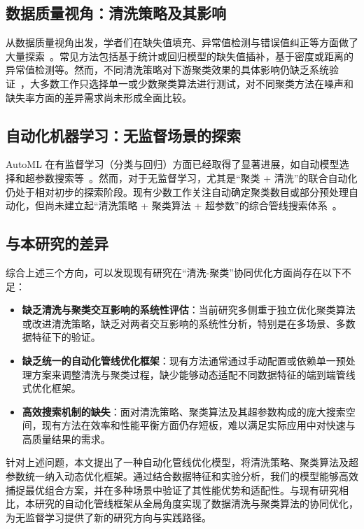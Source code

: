 \documentclass[10pt]{article} %
\numberwithin{equation}{section}
\begin{document}
\subsection{数据质量视角：清洗策略及其影响}
从数据质量视角出发，学者们在缺失值填充、异常值检测与错误值纠正等方面做了大量探索~\cite{ref5, ref6, ref7}。常见方法包括基于统计或回归模型的缺失值插补，基于密度或距离的异常值检测等。然而，不同清洗策略对下游聚类效果的具体影响仍缺乏系统验证~\cite{ref11, ref12}，大多数工作只选择单一或少数聚类算法进行测试，对不同聚类方法在噪声和缺失率方面的差异需求尚未形成全面比较。

\subsection{自动化机器学习：无监督场景的探索}
AutoML 在有监督学习（分类与回归）方面已经取得了显著进展，如自动模型选择和超参数搜索等~\cite{ref13, ref14}。然而，对于无监督学习，尤其是“聚类 + 清洗”的联合自动化仍处于相对初步的探索阶段。现有少数工作关注自动确定聚类数目或部分预处理自动化，但尚未建立起“清洗策略 + 聚类算法 + 超参数”的综合管线搜索体系~\cite{ref15, ref16}。

\subsection{与本研究的差异}
综合上述三个方向，可以发现现有研究在“清洗-聚类”协同优化方面尚存在以下不足：
\begin{itemize}
    \item \textbf{缺乏清洗与聚类交互影响的系统性评估}：当前研究多侧重于独立优化聚类算法或改进清洗策略，缺乏对两者交互影响的系统性分析，特别是在多场景、多数据特征下的验证。
    \item \textbf{缺乏统一的自动化管线优化框架}：现有方法通常通过手动配置或依赖单一预处理方案来调整清洗与聚类过程，缺少能够动态适配不同数据特征的端到端管线式优化框架。
    \item \textbf{高效搜索机制的缺失}：面对清洗策略、聚类算法及其超参数构成的庞大搜索空间，现有方法在效率和性能平衡方面仍存短板，难以满足实际应用中对快速与高质量结果的需求。
\end{itemize}

针对上述问题，本文提出了一种自动化管线优化模型，将清洗策略、聚类算法及超参数统一纳入动态优化框架。通过结合数据特征和实验分析，我们的模型能够高效捕捉最优组合方案，并在多种场景中验证了其性能优势和适配性。与现有研究相比，本研究的自动化管线框架从全局角度实现了数据清洗与聚类算法的协同优化，为无监督学习提供了新的研究方向与实践路径。

\end{document}
